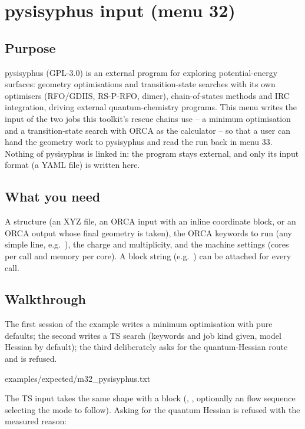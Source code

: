 \chapter{pysisyphus input (menu 32)}
\label{ch:menu32}

\section{Purpose}

pysisyphus (GPL-3.0) is an external program for exploring potential-energy
surfaces: geometry optimisations and transition-state searches with its own
optimisers (RFO/GDIIS, RS-P-RFO, dimer), chain-of-states methods and IRC
integration, driving external quantum-chemistry programs.  This menu writes
the input of the two jobs this toolkit's rescue chains use -- a minimum
optimisation and a transition-state search with ORCA as the calculator -- so
that a user can hand the geometry work to pysisyphus and read the run back in
menu 33.  Nothing of pysisyphus is linked in: the program stays external, and
only its input format (a YAML file) is written here.

\section{What you need}

A structure (an XYZ file, an ORCA input with an inline coordinate block, or an
ORCA output whose final geometry is taken), the ORCA keywords to run (any
simple line, e.g.\ ), the charge and multiplicity, and
the machine settings (cores per call and memory per core).  A block string
(e.g.\ ) can be attached for every call.

\section{Walkthrough}

The first session of the example writes a minimum optimisation with pure
defaults; the second writes a TS search (keywords and job kind given, model
Hessian by default); the third deliberately asks for the quantum-Hessian
route and is refused.


  {examples/expected/m32_pysisyphus.txt}

The TS input takes the same shape with a  block
(, , optionally an
 flow sequence selecting the mode to follow).  Asking for the
quantum Hessian is refused with the measured reason:

